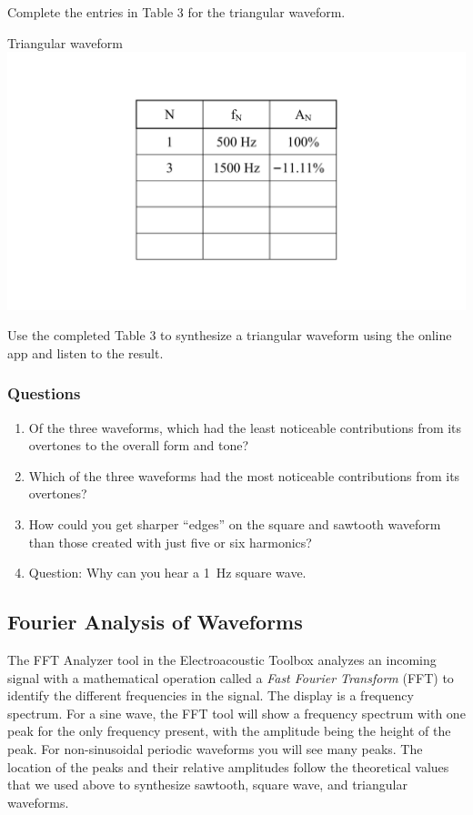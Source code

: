\documentclass[11pt]{NSF}
\def\ben{\begin{enumerate}}
\def\een{\end{enumerate}}
\def\i{\item{}}
\begin{document}
Complete the entries in Table 3 for the triangular waveform.
%
\begin{table}[hbtp]
\begin{center}
Triangular waveform\\
\includegraphics[width=.35\textwidth]{tab5_3}
\label{t:3}
\end{center}
\end{table}
%

Use the completed Table 3 to synthesize a triangular 
waveform using the online app and listen to the result.

\subsubsection*{Questions}
\ben
\i Of the three waveforms, which had the least noticeable 
contributions from its overtones to the overall form and tone?

\i Which of the three waveforms had the most 
noticeable contributions from its overtones?

\i How could you get sharper ``edges” on the square and 
sawtooth waveform than those created with just five or six
harmonics?

\i Question: Why can you hear a 1~Hz square wave.
\een

\subsection{Fourier Analysis of Waveforms}

The FFT Analyzer tool in the Electroacoustic Toolbox 
analyzes an incoming signal with a mathematical operation 
called a {\em Fast Fourier Transform} (FFT) to 
identify the different frequencies in the signal. 
The display is a frequency spectrum.
For a sine wave, the FFT tool will show a frequency spectrum with one peak for
the only frequency present, with the amplitude being the height of the peak.
For non-sinusoidal periodic waveforms you will see many peaks.
The location of the peaks and their relative amplitudes 
follow the theoretical values that we used above to synthesize
sawtooth, square wave, and triangular waveforms.
\end{document}
